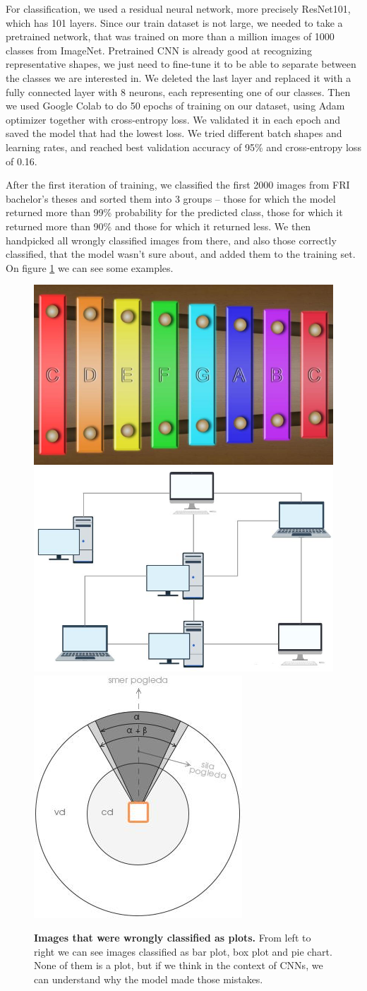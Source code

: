 \documentclass[fleqn,moreauthors,10pt]{ds_report}
\begin{document}
	For classification, we used a residual neural network, more precisely ResNet101, which has 101 layers. Since our train dataset is not large, we needed to take a pretrained network, that was trained on more than a million images of 1000 classes from ImageNet. Pretrained CNN is already good at recognizing representative shapes, we just need to fine-tune it to be able to separate between the classes we are interested in. We deleted the last layer and replaced it with a fully connected layer with 8 neurons, each representing one of our classes. Then we used Google Colab to do 50 epochs of training on our dataset, using Adam optimizer together with cross-entropy loss. We validated it in each epoch and saved the model that had the lowest loss. We tried different batch shapes and learning rates, and reached best validation accuracy of 95\% and cross-entropy loss of 0.16. 
	
	After the first iteration of training, we classified the first 2000 images from FRI bachelor's theses and sorted them into 3 groups -- those for which the model returned more than 99\% probability for the predicted class, those for which it returned more than 90\% and those for which it returned less. We then handpicked all wrongly classified images from there, and also those correctly classified, that the model wasn't sure about, and added them to the training set. On figure \ref{wrong phase1} we can see some examples.
	
	\begin{figure}[h]
		\includegraphics[width=0.36\linewidth]{bar_wrong_ph1.jpeg}
		\includegraphics[width=0.36\linewidth]{box_wrong_ph1.jpeg}
		\includegraphics[width=0.24\linewidth]{pie_wrong_ph1.jpeg}
		\caption{\textbf{Images that were wrongly classified as plots.} From left to right we can see images classified as bar plot, box plot and pie chart. None of them is a plot, but if we think in the context of CNNs, we can understand why the model made those mistakes.}
		\label{wrong phase1}
	\end{figure}
	
\end{document}
